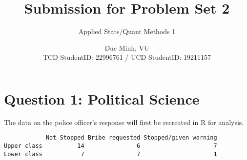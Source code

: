 \documentclass[12pt,letterpaper]{article}
\title{Submission for Problem Set 2}
\date{Duc Minh, VU \\
	TCD StudentID: 22996761 / UCD StudentID: 19211157}
\author{Applied Stats/Quant Methods 1}
\begin{document}
	\maketitle
	\section*{Question 1: Political Science}
	\noindent The data on the police officer's response will first be recreated in R for analysis.
	
	\begin{verbatim}
            Not Stopped Bribe requested Stopped/given warning
Upper class          14               6                     7
Lower class           7               7                     1
	\end{verbatim}
\end{document}
